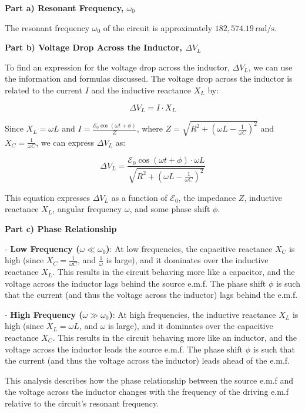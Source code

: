 \documentclass[a4paper,11pt]{article}
\begin{document}
\textbf{Part a) Resonant Frequency, \( \omega_{0} \)}

The resonant frequency \(\omega_{0}\) of the circuit is approximately \(182,574.19 \, \text{rad/s}\).

\textbf{Part b) Voltage Drop Across the Inductor, \( \Delta V_{L} \)}

To find an expression for the voltage drop across the inductor, \( \Delta V_{L} \), we can use the information and formulas discussed. The voltage drop across the inductor is related to the current \(I\) and the inductive reactance \(X_{L}\) by:

\[ \Delta V_{L} = I \cdot X_{L} \]

Since \(X_{L} = \omega L\) and \(I = \frac{\mathcal{E}_{0} \cos(\omega t + \phi)}{Z}\), where \(Z = \sqrt{R^2 + (\omega L - \frac{1}{\omega C})^2}\) and \(X_{C} = \frac{1}{\omega C}\), we can express \( \Delta V_{L} \) as:

\[ \Delta V_{L} = \frac{\mathcal{E}_{0} \cos(\omega t + \phi) \cdot \omega L}{\sqrt{R^2 + (\omega L - \frac{1}{\omega C})^2}} \]

This equation expresses \( \Delta V_{L} \) as a function of \(\mathcal{E}_{0}\), the impedance \(Z\), inductive reactance \(X_{L}\), angular frequency \(\omega\), and some phase shift \(\phi\).

\textbf{Part c) Phase Relationship}

- \textbf{Low Frequency (\(\omega \ll \omega_{0}\))}: At low frequencies, the capacitive reactance \(X_{C}\) is high (since \(X_{C} = \frac{1}{\omega C}\), and \(\frac{1}{\omega}\) is large), and it dominates over the inductive reactance \(X_{L}\). This results in the circuit behaving more like a capacitor, and the voltage across the inductor lags behind the source e.m.f. The phase shift \(\phi\) is such that the current (and thus the voltage across the inductor) lags behind the e.m.f.

- \textbf{High Frequency (\(\omega \gg \omega_{0}\))}: At high frequencies, the inductive reactance \(X_{L}\) is high (since \(X_{L} = \omega L\), and \(\omega\) is large), and it dominates over the capacitive reactance \(X_{C}\). This results in the circuit behaving more like an inductor, and the voltage across the inductor leads the source e.m.f. The phase shift \(\phi\) is such that the current (and thus the voltage across the inductor) leads ahead of the e.m.f.

This analysis describes how the phase relationship between the source e.m.f and the voltage across the inductor changes with the frequency of the driving e.m.f relative to the circuit's resonant frequency. \\
\end{document}
